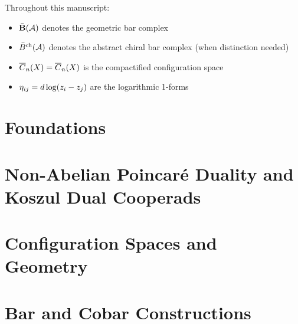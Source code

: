 \documentclass[11pt]{memoir}
\begin{document}
\tableofcontents

\medskip
\noindent

\begin{remark}
Throughout this manuscript:
\begin{itemize}
\item $\bar{\mathbf{B}}(\mathcal{A})$ denotes the geometric bar complex
\item $\bar{B}^{\text{ch}}(\mathcal{A})$ denotes the abstract chiral bar complex (when distinction needed)
\item $\overline{C}_{n}(X) = \overline{C}_n(X)$ is the compactified configuration space
\item $\eta_{ij} = d\log(z_i - z_j)$ are the logarithmic 1-forms
\end{itemize}
\end{remark}

\part{Foundations}



%

\part{Non-Abelian Poincaré Duality and Koszul Dual Cooperads}





\part{Configuration Spaces and Geometry}



\part{Bar and Cobar Constructions}
\end{document}

